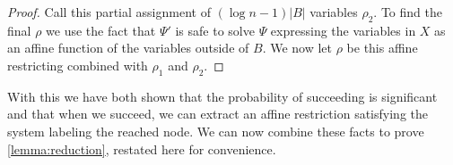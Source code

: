 \documentclass[10pt,a4paper]{article}
\theoremstyle{definition}
\theoremstyle{remark}
\theoremstyle{example}
\theoremstyle{plain}
\begin{document}
{\begin{proof}
    Call this partial assignment of $({\log n}-1)|B|$ variables $\rho_2$. To find the final $\rho$ we use the fact that $\Psi'$ is safe to solve $\Psi$ expressing the variables in $X$ as an affine function of the variables outside of $B$. We now let $\rho$ be this affine restricting combined with $\rho_1$ and $\rho_2$. 
\end{proof}
}


With this we have both shown that the probability of succeeding is significant and that when we succeed, we can extract an affine restriction satisfying the system labeling the reached node. We can now combine these facts to 
{prove \autoref{lemma:reduction}, restated here for convenience.}
\end{document}
